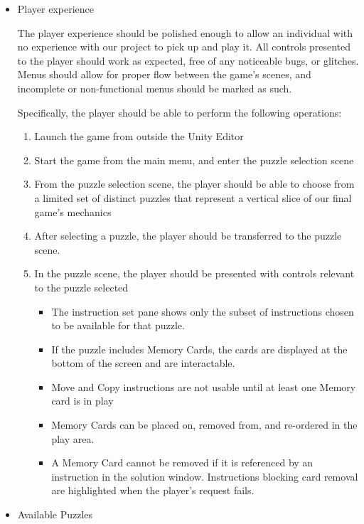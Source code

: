 \begin{itemize}
  \item Player experience
  
  The player experience should be polished enough to allow an individual with no experience with our project to pick up and play it. All controls presented to the player should work as expected, free of any noticeable bugs, or glitches. Menus should allow for proper flow between the game's scenes, and incomplete or non-functional menus should be marked as such.

  Specifically, the player should be able to perform the following operations:

  \begin{enumerate}
    \item Launch the game from outside the Unity Editor
    \item Start the game from the main menu, and enter the puzzle selection scene
    \item From the puzzle selection scene, the player should be able to choose from a limited set of distinct puzzles that represent a vertical slice of our final game's mechanics
    \item After selecting a puzzle, the player should be transferred to the puzzle scene.
    \item In the puzzle scene, the player should be presented with controls relevant to the puzzle selected
    \begin{itemize}
      \item The instruction set pane shows only the subset of instructions chosen to be available for that puzzle.
      \item If the puzzle includes Memory Cards, the cards are displayed at the bottom of the screen and are interactable.
      \item Move and Copy instructions are not usable until at least one Memory card is in play
      \item Memory Cards can be placed on, removed from, and re-ordered in the play area.
      \item A Memory Card cannot be removed if it is referenced by an instruction in the solution window. Instructions blocking card removal are highlighted when the player's request fails.
    \end{itemize}
  \end{enumerate}


  \item Available Puzzles
  

\end{itemize}

